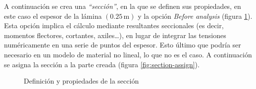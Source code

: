 \documentclass[spanish,a4paper,12pt]{article}
\begin{document}
A continuación se crea una \emph{``sección''}, en la que se definen sus propiedades, en este caso el espesor de la lámina $(0.25\,\text{m})$ y la opción \emph{Before analysis} (figura \ref{fig:section-properties}). 
Esta opción implica el cálculo mediante resultantes seccionales (es decir, momentos flectores, cortantes, axiles\ldots), en lugar de integrar las tensiones numéricamente en una serie de puntos del espesor.
Esto último que podría ser necesario en un modelo de material no lineal, lo que no es el caso.
A continuación se asigna la sección a la parte creada (figura \ref{fig:section-assign}).
\begin{figure}[h!tp]
\centering
{}
\caption{Definición y propiedades de la sección}
\label{fig:section-properties}
\end{figure}
\end{document}
